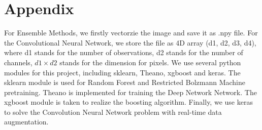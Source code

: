 \documentclass[paper=a4, fontsize=11pt]{scrartcl}
\begin{document}
\section*{Appendix}
For Ensemble Methods, we firstly vectorzie the image and save it as .npy file. For the Convolutional Neural Network, we store the file as 4D array (d1, d2, d3, d4), where d1 stands for the number of observations, d2 stands for the number of channels, $d1 \times d2$ stands for the dimension for pixels.
We use several python modules for this project, including sklearn, Theano, xgboost and keras. The sklearn module is used for Random Forest and Restricted Bolzmann Machine pretraining. Theano is implemented for training the Deep Network Network. The xgboost module is taken to realize the boosting algorithm. Finally, we use keras to solve the Convolution Neural Network problem with real-time data augmentation.
\end{document}
